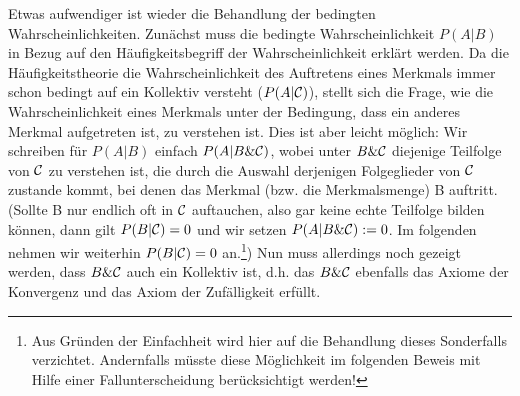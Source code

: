  Etwas aufwendiger ist wieder die Behandlung der bedingten
 Wahrscheinlichkeiten. Zunächst muss die bedingte Wahrscheinlichkeit $P(A|B)$ in
 Bezug auf den Häufigkeitsbegriff der Wahrscheinlichkeit erklärt werden. Da die
 Häufigkeitstheorie die Wahrscheinlichkeit des Auftretens eines Merkmals immer
 schon bedingt auf ein Kollektiv versteht ($P(A|{\cal C})$), stellt sich die
 Frage, wie die Wahrscheinlichkeit eines Merkmals unter der Bedingung, dass ein anderes
 Merkmal aufgetreten ist, zu verstehen ist. Dies ist aber leicht möglich: Wir
 schreiben für $P(A|B)$ einfach $P(A|B \& {\cal C})$, wobei unter $B \& {\cal
 C}$ diejenige Teilfolge von ${\cal C}$ zu verstehen ist, die durch die Auswahl
 derjenigen Folgeglieder von ${\cal C}$ zustande kommt, bei denen das Merkmal
 (bzw. die Merkmalsmenge) B auftritt. (Sollte B nur endlich oft in ${\cal C}$
 auftauchen, also gar keine echte Teilfolge bilden können, dann gilt
 $P(B|{\cal C})=0$ und wir setzen $P(A|B \& {\cal C}):=0$. Im folgenden nehmen
 wir weiterhin $P(B|{\cal C})=0$ an.\footnote{Aus Gründen der Einfachheit
 wird hier auf die Behandlung dieses Sonderfalls verzichtet. Andernfalls
 müsste diese Möglichkeit im folgenden Beweis mit Hilfe einer Fallunterscheidung
 berücksichtigt werden!}) Nun muss allerdings noch gezeigt werden, dass $B \&
 {\cal C}$ auch ein Kollektiv ist, d.h. das $B \& {\cal C}$ ebenfalls 
 das Axiome der Konvergenz und das Axiom der 
 Zufälligkeit erfüllt. 
 
